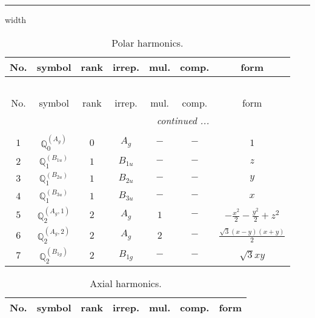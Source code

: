 \documentclass[fleqn,10pt,landscape]{article}
\begin{document}
\begin{itemize}
 \hfil \hrule height 1mm width \textwidth \hfil

\begin{center}
\renewcommand{\arraystretch}{1.3}
\begin{longtable}{ccccccc}
\caption{Polar harmonics.}
 \\
 \hline \hline
No. & symbol & rank & irrep. & mul. & comp. & form \\ \hline \endfirsthead

\multicolumn{6}{l}{\tablename\ \thetable{}} \\
 \hline \hline
No. & symbol & rank & irrep. & mul. & comp. & form \\ \hline \endhead

 \hline \hline
\multicolumn{6}{r}{\footnotesize\it continued ...} \\ \endfoot

 \hline \hline
\multicolumn{6}{r}{} \\ \endlastfoot

$ 1 $ & $ \mathbb{Q}_{0}^{(A_{g})} $ & $ 0 $ & $ A_{g} $ & $ - $ & $ - $ & $ 1 $ \\ \hline
$ 2 $ & $ \mathbb{Q}_{1}^{(B_{1u})} $ & $ 1 $ & $ B_{1u} $ & $ - $ & $ - $ & $ z $ \\
$ 3 $ & $ \mathbb{Q}_{1}^{(B_{2u})} $ & $ 1 $ & $ B_{2u} $ & $ - $ & $ - $ & $ y $ \\
$ 4 $ & $ \mathbb{Q}_{1}^{(B_{3u})} $ & $ 1 $ & $ B_{3u} $ & $ - $ & $ - $ & $ x $ \\ \hline
$ 5 $ & $ \mathbb{Q}_{2}^{(A_{g},1)} $ & $ 2 $ & $ A_{g} $ & $ 1 $ & $ - $ & $ - \frac{x^{2}}{2} - \frac{y^{2}}{2} + z^{2} $ \\
$ 6 $ & $ \mathbb{Q}_{2}^{(A_{g},2)} $ & $ 2 $ & $ A_{g} $ & $ 2 $ & $ - $ & $ \frac{\sqrt{3} \left(x - y\right) \left(x + y\right)}{2} $ \\
$ 7 $ & $ \mathbb{Q}_{2}^{(B_{1g})} $ & $ 2 $ & $ B_{1g} $ & $ - $ & $ - $ & $ \sqrt{3} x y $ \\
\end{longtable}
\end{center}
\begin{center}
\renewcommand{\arraystretch}{1.3}
\begin{longtable}{ccccccc}
\caption{Axial harmonics.}
 \\
 \hline \hline
No. & symbol & rank & irrep. & mul. & comp. & form \\ \hline \endfirsthead


\end{longtable}
\end{center}
\end{itemize}
\end{document}
